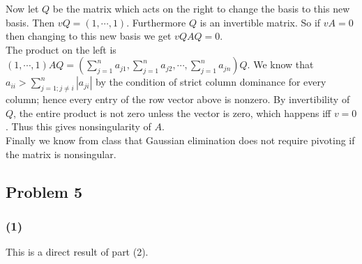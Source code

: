 \documentclass{article}
\begin{document}
Now let $Q$ be the matrix which acts on the right to change the basis to this new basis. Then $vQ=(1,\cdots ,1)$. Furthermore $Q$ is an invertible matrix. 
So if $vA=0$ then changing to this new basis we get $vQAQ=0$. 
\\The product on the left is $(1,\cdots,1)AQ = \left( \displaystyle\sum_{j=1}^n a_{j1}, \displaystyle\sum_{j=1}^n a_{j2},\cdots ,\displaystyle\sum_{j=1}^n a_{jn} \right)Q$. We know that $a_{ii} > \displaystyle\sum_{j=1; j\neq i}^n |a_{ji}|$ by the condition of strict column dominance for every column; hence every entry of the row vector above is nonzero. By invertibility of $Q$, the entire product is not zero unless the vector is zero, which happens iff $v=0$. Thus this gives nonsingularity of $A$.
\\Finally we know from class that Gaussian elimination does not require pivoting if the matrix is nonsingular.

\subsection{Problem 5}
\subsubsection{(1)}
This is a direct result of part (2).
\end{document}
